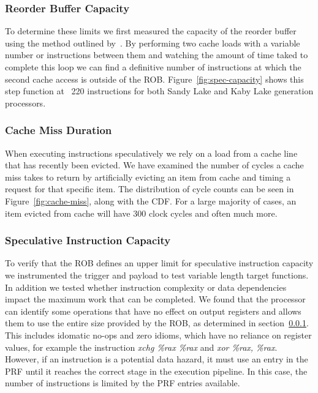 \subsubsection{Reorder Buffer Capacity} \label{sssec:ROB}
To determine these limits we first measured the capacity of the reorder buffer
using the method outlined by~\cite{intel-rob-capacity}. By performing two cache loads
with a variable number or instructions between them and watching the amount of 
time taked to complete this loop we can find a definitive number of instructions
at which the second cache access is outside of the ROB. Figure~\ref{fig:spec-capacity}
shows this step function at ~220 instructions for both Sandy Lake and Kaby Lake 
generation processors. 

\subsubsection{Cache Miss Duration}
When executing instructions speculatively we rely on a load from a cache line that
has recently been evicted. We have examined the number of cycles a
cache miss takes to return by artificially evicting an item from cache and timing 
a request for that specific item. The distribution of cycle counts can be seen in
Figure~\ref{fig:cache-miss}, along with the CDF. For a large majority of cases, 
an item evicted from cache will have 300 clock cycles and often much more. 

\subsubsection{Speculative Instruction Capacity}
To verify that the ROB defines an upper limit for speculative instruction capacity
we instrumented the trigger and payload to test variable length target functions. 
In addition we tested whether instruction complexity or data dependencies impact
the maximum work that can be completed. We found that the processor can identify 
some operations that have no effect on output registers and allows them to use the 
entire size provided by the ROB, as determined in section~\ref{sssec:ROB}. This includes 
idomatic no-ops and zero idioms, which have no reliance on register values, 
for example the instruction \textit{xchg \%rax \%rax} and \textit{xor \%rax, \%rax}. 
However, if an instruction is a potential data hazard, it must use an entry in the PRF
until it reaches the correct stage in the execution pipeline. In this case, the number 
of instructions is limited by the PRF entries available.

